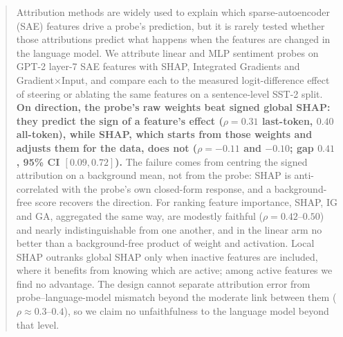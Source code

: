 \begin{abstract}
Attribution methods are widely used to explain which sparse-autoencoder (SAE) features drive a probe's prediction, but it is rarely tested whether those attributions predict what happens when the features are changed in the language model. We attribute linear and MLP sentiment probes on GPT-2 layer-7 SAE features with SHAP, Integrated Gradients and Gradient$\times$Input, and compare each to the measured logit-difference effect of steering or ablating the same features on a sentence-level SST-2 split. \textbf{On direction, the probe's raw weights beat signed global SHAP: they predict the sign of a feature's effect ($\rho=0.31$ last-token, $0.40$ all-token), while SHAP, which starts from those weights and adjusts them for the data, does not ($\rho=-0.11$ and $-0.10$; gap $0.41$, 95\% CI $[0.09,0.72]$).} The failure comes from centring the signed attribution on a background mean, not from the probe: SHAP is anti-correlated with the probe's own closed-form response, and a background-free score recovers the direction. For ranking feature importance, SHAP, IG and GA, aggregated the same way, are modestly faithful ($\rho=0.42$--$0.50$) and nearly indistinguishable from one another, and in the linear arm no better than a background-free product of weight and activation. Local SHAP outranks global SHAP only when inactive features are included, where it benefits from knowing which are active; among active features we find no advantage. The design cannot separate attribution error from probe--language-model mismatch beyond the moderate link between them ($\rho\approx0.3$--$0.4$), so we claim no unfaithfulness to the language model beyond that level.
\end{abstract}
